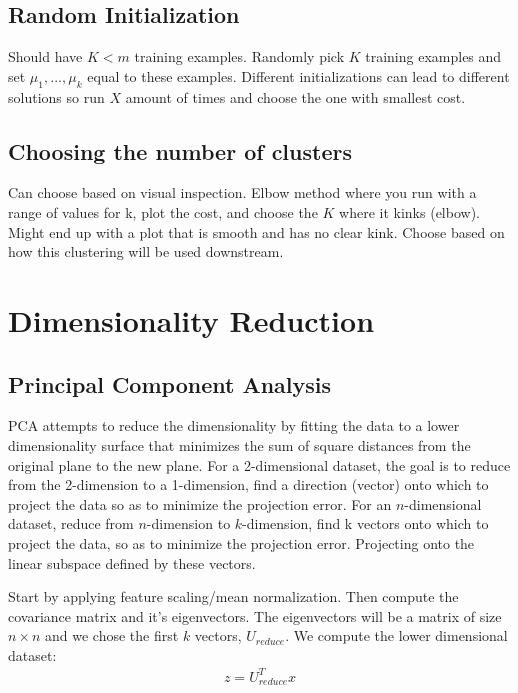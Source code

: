 \documentclass[12pt]{article}
\begin{document}
\subsection{Random Initialization}
Should have $K<m$ training examples. Randomly pick $K$ training examples and set $\mu_1,...,\mu_k$ equal to these examples. Different initializations can lead to different solutions so run $X$ amount of times and choose the one with smallest cost.

\subsection{Choosing the number of clusters}
Can choose based on visual inspection. Elbow method where you run with a range of values for k, plot the cost, and choose the $K$ where it kinks (elbow). Might end up with a plot that is smooth and has no clear kink. Choose based on how this clustering will be used downstream.

\section{Dimensionality Reduction}
\subsection{Principal Component Analysis}
PCA attempts to reduce the dimensionality by fitting the data to a lower dimensionality surface that minimizes the sum of square distances from the original plane to the new plane. For a 2-dimensional dataset, the goal is to reduce from the 2-dimension to a 1-dimension, find a direction (vector) onto which to project the data so as to minimize the projection error. For an $n$-dimensional dataset, reduce from $n$-dimension to $k$-dimension, find k vectors onto which to project the data, so as to minimize the projection error. Projecting onto the linear subspace defined by these vectors.

Start by applying feature scaling/mean normalization. Then compute the covariance matrix and it's eigenvectors. The eigenvectors will be a matrix of size $n\times n$ and we chose the first $k$ vectors, $U_{reduce}$. We compute the lower dimensional dataset:
\begin{align*}
z = U_{reduce}^Tx
\end{align*}

	
\end{document}
